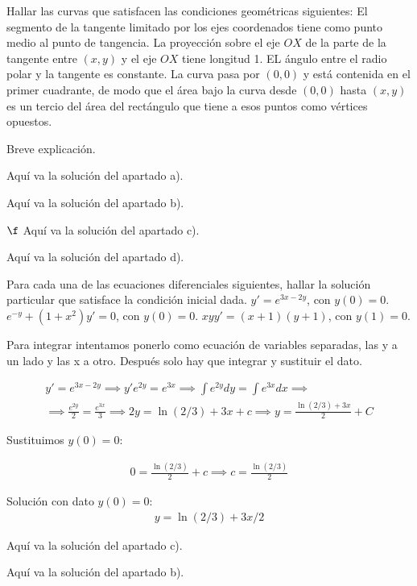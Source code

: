 \documentclass[nochap]{apuntes}
\begin{document}
\begin{problem}[12]
Hallar las curvas que satisfacen las condiciones geométricas siguientes:
\ppart
El segmento de la tangente limitado por los ejes coordenados tiene como punto medio al punto de tangencia.
\ppart
La proyección sobre el eje $OX$ de la parte de la tangente entre $(x,y)$ y el eje $OX$ tiene longitud 1.
\ppart
EL ángulo entre el radio polar y la tangente es constante.
\ppart
La curva pasa por $(0,0)$ y está contenida en el primer cuadrante, de modo que el área bajo la curva desde $(0,0)$ hasta $(x,y)$ es un tercio del área del rectángulo que tiene a esos puntos como vértices opuestos.
\solution

\begin{expla}
Breve explicación.
\end{expla}

\spart
Aquí va la solución del apartado a).

\spart 
Aquí va la solución del apartado b).

\spart
$\f$ Aquí va la solución del apartado c).

\spart 
Aquí va la solución del apartado d).

\end{problem}
\newpage
\begin{problem}[13]
Para cada una de las ecuaciones diferenciales siguientes, hallar la solución particular que satisface la condición inicial dada.
\ppart $y'=e^{3x-2y}$, con $y(0)=0$.
\ppart $e^{-y}+(1+x^2)y'=0$, con $y(0)=0$.
\ppart $xyy'=(x+1)(y+1)$, con $y(1)=0$.

\solution

\begin{expla}
Para integrar intentamos ponerlo como ecuación de variables separadas, las y a un lado y las x a otro. Después solo hay que integrar y sustituir el dato.
\end{expla}
\spart
\begin{gather*}
y'=e^{3x-2y} \implies y'{e^{2y}}=e^{3x} \implies \int e^{2y}dy=\int e^{3x}dx \implies \\ \implies \frac{e^{2y}}{2}=\frac{e^{3x}}{3} \implies 2y=\ln(2/3)+3x+c \implies y=\frac{\ln(2/3)+3x}{2}+C
\end{gather*}

Sustituimos $y(0)=0$:

\begin{gather*}
0=\frac{\ln(2/3)}{2}+c \implies c=\frac{\ln(2/3)}{2}
\end{gather*}

Solución con dato $y(0)=0$:
\begin{gather*}
y=\ln(2/3)+3x/2
\end{gather*}

\spart
Aquí va la solución del apartado c).

\spart
Aquí va la solución del apartado b).

\end{problem}
\end{document}
